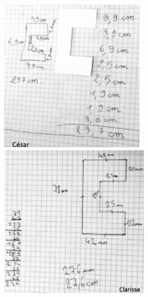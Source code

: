 {\begin{exercice}[CRPE 2016 G3]
\begin{center}
   \includegraphics[height=7.5cm]{Grandeurs_mesures_did/Images/Grm7_analyse_TC_Cesar}
   \quad
   \includegraphics[height=7.5cm]{Grandeurs_mesures_did/Images/Grm7_analyse_TC_Clarisse}
\end{center}
\end{exercice}

}
